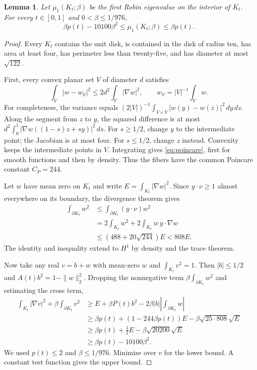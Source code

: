 \documentclass[11pt,a4paper]{article}
\newtheorem{lemma}[theorem]{Lemma}
\theoremstyle{remark}
\begin{document}
\begin{lemma}\label{lem:fiber}
Let $\mu_1(K_t;\beta)$ be the first Robin eigenvalue on the interior of $K_t$. For every $t\in[0,1]$ and $0<\beta\le1/976$,
\begin{equation}\label{eq:fiber}
 \beta p(t)-10100\beta^2\le\mu_1(K_t;\beta)\le\beta p(t).
\end{equation}
\end{lemma}
\begin{proof}
Every $K_t$ contains the unit disk, is contained in the disk of radius ten, has area at least four, has perimeter less than twenty-five, and has diameter at most $\sqrt{122}$.

First, every convex planar set $V$ of diameter $d$ satisfies
\begin{equation}\label{eq:poincare}
 \int_V|w-w_V|^2\le2d^2\int_V|\nabla w|^2,
 \qquad w_V=|V|^{-1}\int_Vw.
\end{equation}
For completeness, the variance equals $(2|V|)^{-1}\int_{V\times V}|w(y)-w(z)|^2\,dy\,dz$. Along the segment from $z$ to $y$, the squared difference is at most
$d^2\int_0^1|\nabla w((1-s)z+sy)|^2\,ds$. For $s\ge1/2$, change $y$ to the intermediate point; the Jacobian is at most four. For $s\le1/2$, change $z$ instead. Convexity keeps the intermediate points in $V$. Integrating gives \eqref{eq:poincare}, first for smooth functions and then by density. Thus the fibers have the common Poincare constant $C_P=244$.

Let $w$ have mean zero on $K_t$ and write $E=\int_{K_t}|\nabla w|^2$. Since $y\cdot\nu\ge1$ almost everywhere on its boundary, the divergence theorem gives
\begin{align*}
 \int_{\partial K_t}w^2
 &\le\int_{\partial K_t}(y\cdot\nu)w^2\\
 &=2\int_{K_t}w^2+2\int_{K_t}w\,y\cdot\nabla w\\
 &\le(488+20\sqrt{244})E<808E.
\end{align*}
The identity and inequality extend to $H^1$ by density and the trace theorem.

Now take any real $v=b+w$ with mean-zero $w$ and $\int_{K_t}v^2=1$. Then $|b|\le1/2$ and $A(t)b^2=1-\|w\|_2^2$. Dropping the nonnegative term $\beta\int_{\partial K_t}w^2$ and estimating the cross term,
\begin{align*}
 \int_{K_t}|\nabla v|^2+\beta\int_{\partial K_t}v^2
 &\ge E+\beta P(t)b^2-2\beta|b|\left|\int_{\partial K_t}w\right|\\
 &\ge\beta p(t)+(1-244\beta p(t))E
        -\beta\sqrt{25\cdot808}\sqrt E\\
 &\ge\beta p(t)+\tfrac12 E-\beta\sqrt{20200}\sqrt E\\
 &\ge\beta p(t)-10100\beta^2.
\end{align*}
We used $p(t)\le2$ and $\beta\le1/976$. Minimize over $v$ for the lower bound. A constant test function gives the upper bound.
\end{proof}
\end{document}
